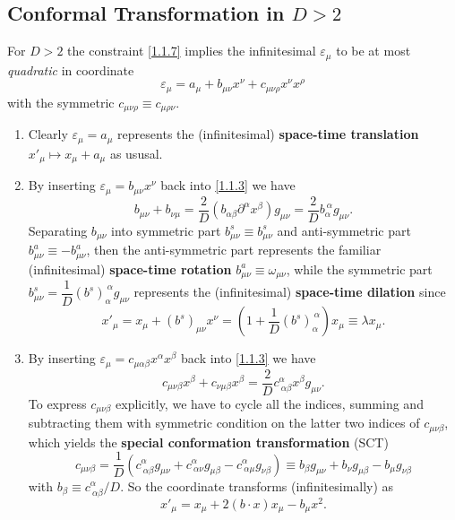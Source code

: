 \documentclass[10pt,nofootinbib]{revtex4}
\begin{document}
	\subsection{Conformal Transformation in $D>2$}
		For $D>2$ the constraint \eqref{1.1.7} implies the infinitesimal $\varepsilon_\mu$ to be at most \emph{quadratic} in coordinate
		\begin{equation*}
			\varepsilon_\mu=a_\mu+b_{\mu\nu}x^\nu+c_{\mu\nu\rho}x^\nu x^\rho
		\end{equation*}
		with the symmetric $c_{\mu\nu\rho}\equiv c_{\mu\rho\nu}$.\par
		\begin{enumerate}[1)]
			\item Clearly $\varepsilon_\mu=a_\mu$ represents the (infinitesimal) \textbf{space-time translation} $x'_\mu\mapsto x_\mu+a_\mu$ as ususal.
			\item By inserting $\varepsilon_\mu=b_{\mu\nu}x^\nu$ back into \eqref{1.1.3} we have
				\begin{equation*}
					b_{\mu\nu}+b_{\nu\mu}=\dfrac{2}{D}(b_{\alpha\beta} \partial^\alpha x^\beta) g_{\mu\nu}=\dfrac{2}{D}b_\alpha^{~\alpha}g_{\mu\nu}.
				\end{equation*}
				Separating $b_{\mu\nu}$ into symmetric part $b^s_{\mu\nu}\equiv b^s_{\mu\nu}$ and anti-symmetric part $b^a_{\mu\nu}\equiv-b^a_{\mu\nu}$, then the anti-symmetric part represents the familiar (infinitesimal) \textbf{space-time rotation} $b^a_{\mu\nu}\equiv\omega_{\mu\nu}$, while the symmetric part $b^s_{\mu\nu}=\dfrac{1}{D}(b^s)_\alpha^{~\alpha}g_{\mu\nu}$ represents the (infinitesimal) \textbf{space-time dilation} since
				\begin{equation*}
					x'_\mu=x_\mu+(b^s)_{\mu\nu}x^\nu=\left(1+\dfrac{1}{D}(b^s)_\alpha^{~\alpha}\right)x_\mu\equiv\lambda x_\mu.
				\end{equation*}
			\item By inserting $\varepsilon_\mu=c_{\mu \alpha\beta}x^\alpha x^\beta$ back into \eqref{1.1.3} we have
				\begin{equation*}
					c_{\mu\nu\beta}x^\beta+c_{\nu\mu\beta}x^\beta=\dfrac{2}{D}c^\alpha_{~\alpha\beta}x^\beta g_{\mu\nu}.
				\end{equation*}
				To express $c_{\mu\nu\beta}$ explicitly, we have to cycle all the indices, summing and subtracting them with symmetric condition on the latter two indices of $c_{\mu\nu\beta}$, which yields the \textbf{special conformation transformation} (SCT)
				\begin{equation*}
					c_{\mu\nu\beta}=\dfrac{1}{D}(c^\alpha_{~\alpha\beta}g_{\mu\nu}+c^\alpha_{~\alpha\nu}g_{\mu\beta}-c^\alpha_{~\alpha\mu}g_{\nu\beta})\equiv b_\beta g_{\mu\nu}+b_\nu g_{\mu\beta}-b_\mu g_{\nu\beta}
				\end{equation*}
				with $b_\beta\equiv c^\alpha_{~\alpha\beta}/D$. So the coordinate transforms (infinitesimally) as
				\begin{equation*}
					x'_\mu=x_\mu+2(b\cdot x)x_\mu-b_\mu x^2.
				\end{equation*}
		\end{enumerate}
\end{document}
